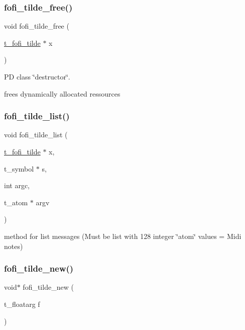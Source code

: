 \subsubsection{\texorpdfstring{fofi\_tilde\_free()}{fofi\_tilde\_free()}}
{\footnotesize\ttfamily void fofi\+\_\+tilde\+\_\+free (\begin{DoxyParamCaption}\item[{\mbox{\hyperlink{fofi~_8h_a9d4d0a864b5185ebc589d41112da08ce}{t\+\_\+fofi\+\_\+tilde}} $\ast$}]{x }\end{DoxyParamCaption})}



PD class \char`\"{}destructor\char`\"{}. 

frees dynamically allocated ressources \mbox{\label{fofi~_8h_a83449b8d535886ef9d7ecd42146932c3}} 
\subsubsection{\texorpdfstring{fofi\_tilde\_list()}{fofi\_tilde\_list()}}
{\footnotesize\ttfamily void fofi\+\_\+tilde\+\_\+list (\begin{DoxyParamCaption}\item[{\mbox{\hyperlink{fofi~_8h_a9d4d0a864b5185ebc589d41112da08ce}{t\+\_\+fofi\+\_\+tilde}} $\ast$}]{x,  }\item[{t\+\_\+symbol $\ast$}]{s,  }\item[{int}]{argc,  }\item[{t\+\_\+atom $\ast$}]{argv }\end{DoxyParamCaption})}



method for list messages (Must be list with 128 integer \char`\"{}atom\char`\"{} values = Midi notes) 

\mbox{\label{fofi~_8h_a523787a74d7b8f02c80d1e0cc0468699}} 
\subsubsection{\texorpdfstring{fofi\_tilde\_new()}{fofi\_tilde\_new()}}
{\footnotesize\ttfamily void$\ast$ fofi\+\_\+tilde\+\_\+new (\begin{DoxyParamCaption}\item[{t\+\_\+floatarg}]{f }\end{DoxyParamCaption})}



